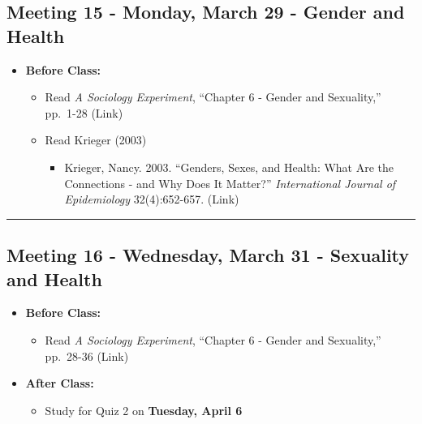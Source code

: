 \documentclass[
]{book}
\providecommand{\tightlist}{%
  \setlength{\itemsep}{0pt}\setlength{\parskip}{0pt}}
\begin{document}
\hypertarget{meeting-15---monday-march-29---gender-and-health}{%
\subsection*{Meeting 15 - Monday, March 29 - Gender and Health}\label{meeting-15---monday-march-29---gender-and-health}}

\begin{itemize}
\tightlist
\item
  \textbf{Before Class:}

  \begin{itemize}
  \tightlist
  \item
    Read \emph{A Sociology Experiment}, ``Chapter 6 - Gender and Sexuality,'' pp.~1-28 (Link)
  \item
    Read Krieger (2003)

    \begin{itemize}
    \tightlist
    \item
      Krieger, Nancy. 2003. ``Genders, Sexes, and Health: What Are the Connections - and Why Does It Matter?'' \emph{International Journal of Epidemiology} 32(4):652-657. (Link)
    \end{itemize}
  \end{itemize}
\end{itemize}

\begin{center}\rule{0.5\linewidth}{0.5pt}\end{center}

\hypertarget{meeting-16---wednesday-march-31---sexuality-and-health}{%
\subsection*{Meeting 16 - Wednesday, March 31 - Sexuality and Health}\label{meeting-16---wednesday-march-31---sexuality-and-health}}

\begin{itemize}
\tightlist
\item
  \textbf{Before Class:}

  \begin{itemize}
  \tightlist
  \item
    Read \emph{A Sociology Experiment}, ``Chapter 6 - Gender and Sexuality,'' pp.~28-36 (Link)
  \end{itemize}
\item
  \textbf{After Class:}

  \begin{itemize}
  \tightlist
  \item
    Study for Quiz 2 on \textbf{Tuesday, April 6}
  \end{itemize}
\end{itemize}
\end{document}
